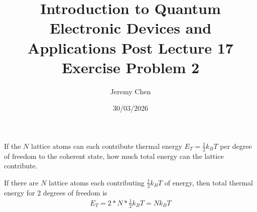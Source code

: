 \documentclass[10pt,letterpaper]{article}
\title{Introduction to Quantum Electronic Devices and Applications Post Lecture 17 Exercise Problem 2}
\author{Jeremy Chen}
\date{30/03/2026}
\begin{document}
\maketitle
	
\noindent If the $N$ lattice atoms can each contribute thermal energy $E_{T} = \frac{1}{2}k_{B}T$ per degree of freedom to the coherent state, how much total energy can the lattice contribute. 

\color{violet}
If there are $N$ lattice atoms each contributing $\frac{1}{2}k_{B}T$ of energy, then total thermal energy for 2 degrees of freedom is
\begin{gather*}
E_{T} = 2 * N * \frac{1}{2}k_{B}T = Nk_{B}T
\end{gather*}
\color{black}	
	
\end{document}
